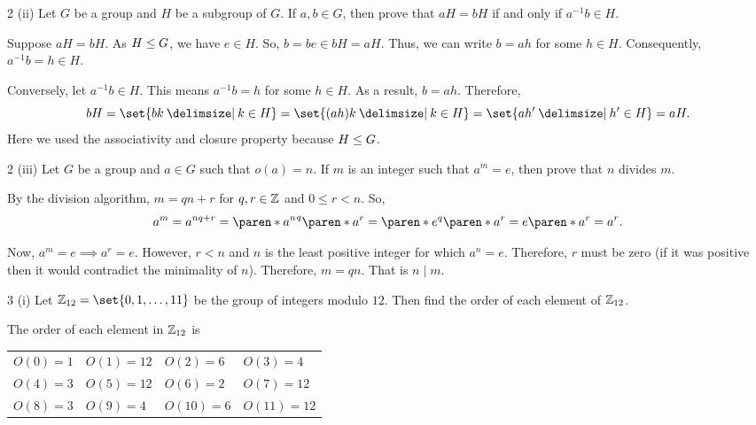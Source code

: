 \documentclass[11pt]{penrose}
\begin{document}
\begin{problem}{2 (ii)}
    Let $G$ be a group and $H$ be a subgroup of $G$. If $a, b \in G$, then prove that $aH = bH$ if and only if $a^{-1} b \in H$.

    \solution Suppose $aH = bH$. As $H \mathrel{\leq} G$, we have $e \in H$. So, $b = be \in bH = aH$. Thus, we can write $b = ah$ for some $h \in H$. Consequently, $a^{-1} b = h \in H$.

    Conversely, let $a^{-1} b \in H$. This means $a^{-1} b = h$ for some $h \in H$. As a result, $b = ah$. Therefore,
    \begin{equation*}
        bH = \set{bk \st k \in H} = \set{(ah)k \st k \in H} = \set{ah' \st h' \in H} = aH.
    \end{equation*}
    Here we used the associativity and closure property because $H \mathrel{\leq} G$.
\end{problem}

\begin{problem}{2 (iii)}
    Let $G$ be a group and $a \in G$ such that $o(a) = n$. If $m$ is an integer such that $a^m = e$, then prove that $n$ divides $m$.

    \solution By the division algorithm, $m = qn + r$ for $q, r \in \mathbb{Z}$ and $0 \leq r < n$. So,
    \begin{equation*}
        a^m = a^{nq + r} = \paren*{{a^n}^q} \paren*{a^r} = \paren*{e^q} \paren*{a^r} = e \paren*{a^r} = a^r.
    \end{equation*}

    Now, $a^m = e \implies a^r = e$. However, $r < n$ and $n$ is the least positive integer for which $a^n = e$. Therefore, $r$ must be zero (if it was positive then it would contradict the minimality of $n$). Therefore, $m = qn$. That is $n \mid m$.
\end{problem}

\begin{problem}{3 (i)}
    Let $\Z_{12} = \set{0, 1, \dots, 11}$ be the group of integers modulo $12$. Then find the order of each element of $\mathbb{Z}_{12}$.

    \solution The order of each element in $\mathbb{Z}_{12}$ is
    \begin{center}
    \begin{tabularx}{0.8\textwidth}{XXXX}
        $O(0)  =  1$ & $O(1)  = 12$ & $O(2)  =  6$ & $O(3)  =  4$\\
        $O(4)  =  3$ & $O(5)  = 12$ & $O(6)  =  2$ & $O(7)  = 12$\\
        $O(8)  =  3$ & $O(9)  =  4$ & $O(10) =  6$ & $O(11) = 12$\\
    \end{tabularx}
    \end{center}
\end{problem}
\end{document}
